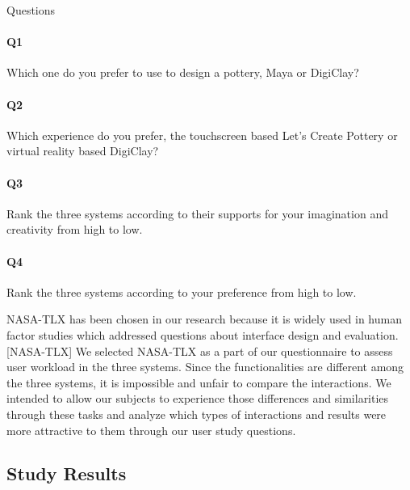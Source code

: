 Questions

\paragraph{Q1} Which one do you prefer to use to design a pottery, Maya or DigiClay?
\paragraph{Q2} Which experience do you prefer, the touchscreen based Let's Create Pottery or virtual reality based DigiClay?
\paragraph{Q3} Rank the three systems according to their supports for your imagination and creativity from high to low.
\paragraph{Q4} Rank the three systems according to your preference from high to low.

NASA-TLX has been chosen in our research because it is widely used in human factor studies which addressed questions about interface design and evaluation.[NASA-TLX] We selected NASA-TLX as a part of our questionnaire to assess user workload in the three systems. Since the functionalities are different among the three systems, it is impossible and unfair to compare the interactions. We intended to allow our subjects to experience those differences and similarities through these tasks and analyze which types of interactions and results were more attractive to them through our user study questions.





\subsection{Study Results}
\label{sec:6.4}

